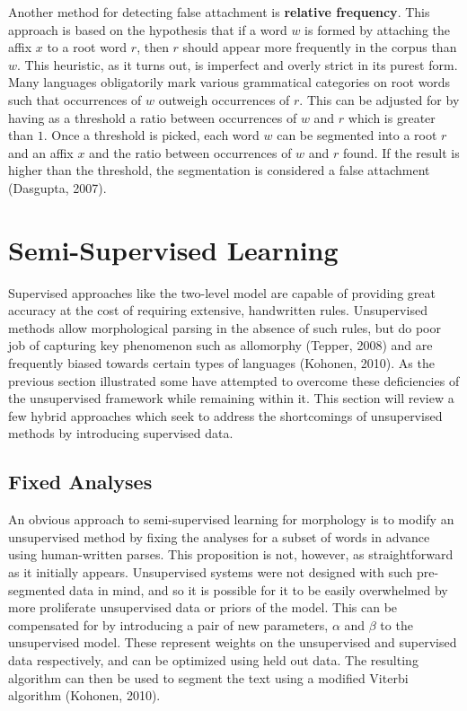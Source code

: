 \documentclass[12pt]{article}
\begin{document}
Another method for detecting false attachment is \textbf{relative frequency}. This approach is based on the hypothesis that if a word $w$ is formed by attaching the affix $x$ to a root word $r$, then $r$ should appear more frequently in the corpus than $w$. This heuristic, as it turns out, is imperfect and overly strict in its purest form. Many languages obligatorily mark various grammatical categories on root words such that occurrences of $w$ outweigh occurrences of $r$. This can be adjusted for by having as a threshold a ratio between occurrences of $w$ and $r$ which is greater than $1$. Once a threshold is picked, each word $w$ can be segmented into a root $r$ and an affix $x$ and the ratio between occurrences of $w$ and $r$ found. If the result is higher than the threshold, the segmentation is considered a false attachment (Dasgupta, 2007).

\section{Semi-Supervised Learning}
Supervised approaches like the two-level model are capable of providing great accuracy at the cost of requiring extensive, handwritten rules. Unsupervised methods allow morphological parsing in the absence of such rules, but do poor job of capturing key phenomenon such as allomorphy (Tepper, 2008) and are frequently biased towards certain types of languages (Kohonen, 2010). As the previous section illustrated some have attempted to overcome these deficiencies of the unsupervised framework while remaining within it. This section will review a few hybrid approaches which seek to address the shortcomings of unsupervised methods by introducing supervised data.

\subsection{Fixed Analyses}
An obvious approach to semi-supervised learning for morphology is to modify an unsupervised method by fixing the analyses for a subset of words in advance using human-written parses. This proposition is not, however, as straightforward as it initially appears. Unsupervised systems were not designed with such pre-segmented data in mind, and so it is possible for it to be easily overwhelmed by more proliferate unsupervised data or priors of the model. This can be compensated for by introducing a pair of new parameters, $\alpha$ and $\beta$ to the unsupervised model. These represent weights on the unsupervised and supervised data respectively, and can be optimized using held out data. The resulting algorithm can then be used to segment the text using a modified Viterbi algorithm (Kohonen, 2010).
\end{document}
